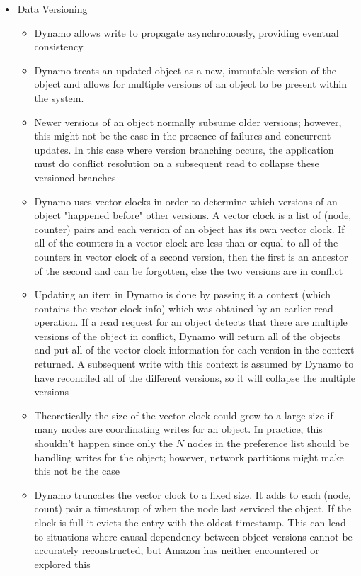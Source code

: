 \documentclass[a4paper]{article}
\begin{document}
\begin{itemize}
\begin{itemize}
\item Data Versioning
\begin{itemize}
\item Dynamo allows write to propagate asynchronously, providing eventual consistency

\item Dynamo treats an updated object as a new, immutable version of the object and allows for multiple versions of an object to be present within the system.

\item Newer versions of an object normally subsume older versions; however, this might not be the case in the presence  of failures and concurrent updates. In this case where version branching occurs, the application must do conflict resolution on a subsequent read to collapse these versioned branches

\item Dynamo uses vector clocks in order to determine which versions of an object "happened before" other versions. A vector clock is a list of (node, counter) pairs and each version of an object has its own vector clock. If all of the counters in a vector clock are less than or equal to all of the counters in vector clock of a second version, then the first is an ancestor of the second and can be forgotten, else the two versions are in conflict

\item Updating an item in Dynamo is done by passing it a context (which contains the vector clock info) which was obtained by an earlier read operation. If a read request for an object detects that there are multiple versions of the object in conflict, Dynamo will return all of the objects and put all of the vector clock information for each version in the context returned. A subsequent write with this context is assumed by Dynamo to have reconciled all of the different versions, so it will collapse the multiple versions

\item Theoretically the size of the vector clock could grow to a large size if many nodes are coordinating writes for an object. In practice, this shouldn't happen since only the $N$ nodes in the preference list should be handling writes for the object; however, network partitions might make this not be the case

\item Dynamo truncates the vector clock to a fixed size. It adds to each (node, count) pair a timestamp of when the node last serviced the object. If the clock is full it evicts the entry with the oldest timestamp. This can lead to situations where causal dependency between object versions cannot be accurately reconstructed, but Amazon has neither encountered or explored this
\end{itemize}


\end{itemize}
\end{itemize}
\end{document}
